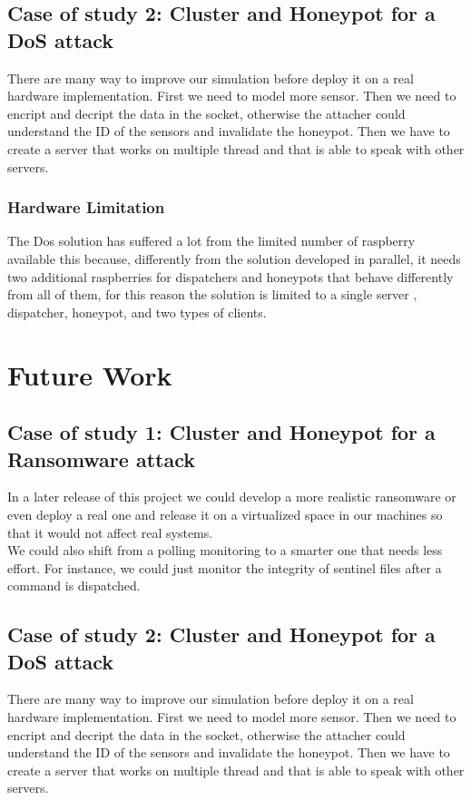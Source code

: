 \subsection{Case of study 2: Cluster and Honeypot for a DoS attack}

There are many way to improve our simulation before deploy it on a real hardware implementation. First we need to model more sensor. Then we need to encript and decript the data in the socket, otherwise the attacher could understand the ID of the sensors and invalidate the honeypot. Then we have to create a server that works on multiple thread and that is able to speak with other servers.

\subsubsection{Hardware Limitation}

The Dos solution has suffered a lot from the limited number of raspberry available this because, differently from the solution developed in parallel, it needs two additional raspberries for dispatchers and honeypots that behave differently from all of them, for this reason the solution is limited to a single server , dispatcher, honeypot, and two types of clients.

\section{Future Work}

\subsection{Case of study 1: Cluster and Honeypot for a Ransomware attack}

In a later release of this project we could develop a more realistic ransomware or even deploy a real one and release it on a virtualized space in our machines so that it would not affect real systems.\\
We could also shift from a polling monitoring to a smarter one that needs less effort. For instance, we could just monitor the integrity of sentinel files after a command is dispatched.

\subsection{Case of study 2: Cluster and Honeypot for a DoS attack}
There are many way to improve our simulation before deploy it on a real hardware implementation. First we need to model more sensor. Then we need to encript and decript the data in the socket, otherwise the attacher could understand the ID of the sensors and invalidate the honeypot. Then we have to create a server that works on multiple thread and that is able to speak with other servers. 